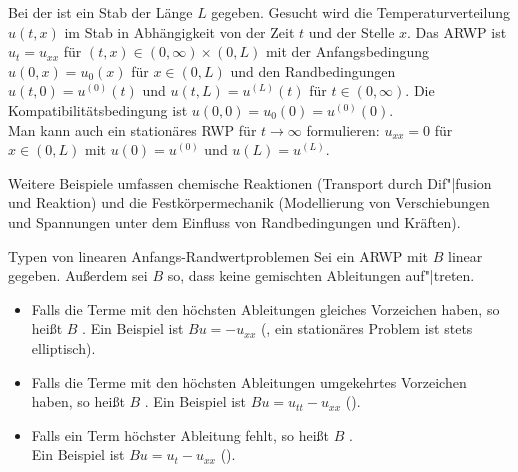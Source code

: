 \begin{Bsp}
    Bei der  ist ein Stab
    der Länge $L$ gegeben.
    Gesucht wird die Temperaturverteilung $u(t, x)$ im Stab in Abhängigkeit
    von der Zeit $t$ und der Stelle $x$.
    Das ARWP ist $u_t = u_{xx}$ für $(t, x) \in (0, \infty) \times (0, L)$ mit
    der Anfangsbedingung $u(0, x) = u_0(x)$ für $x \in (0, L)$ und den
    Randbedingungen $u(t, 0) = u^{(0)}(t)$ und $u(t, L) = u^{(L)}(t)$
    für $t \in (0, \infty)$.
    Die Kompatibilitätsbedingung ist $u(0, 0) = u_0(0) = u^{(0)}(0)$.\\
    Man kann auch ein stationäres RWP für $t \to \infty$ formulieren:
    $u_{xx} = 0$ für $x \in (0, L)$ mit
    $u(0) = u^{(0)}$ und $u(L) = u^{(L)}$.
\end{Bsp}

\begin{Bsp}
    Weitere Beispiele umfassen chemische Reaktionen
    (Transport durch Dif"|fusion und Reaktion) und die Festkörpermechanik
    (Modellierung von Verschiebungen und Spannungen unter dem Einfluss von
    Randbedingungen und Kräften).
\end{Bsp}

\linie

\begin{Def}{Typen von linearen Anfangs-Randwertproblemen}
    Sei ein ARWP mit $B$ linear gegeben.
    Außerdem sei $B$ so, dass keine gemischten Ableitungen auf"|treten.
    \begin{itemize}
        \item
        Falls die Terme mit den höchsten Ableitungen gleiches Vorzeichen
        haben, so heißt $B$ .
        Ein Beispiel ist $Bu = -u_{xx}$
        (,
        ein stationäres Problem ist stets elliptisch).

        \item
        Falls die Terme mit den höchsten Ableitungen umgekehrtes Vorzeichen
        haben, so heißt $B$ .
        Ein Beispiel ist $Bu = u_{tt} - u_{xx}$
        ().

        \item
        Falls ein Term höchster Ableitung fehlt,
        so heißt $B$ .\\
        Ein Beispiel ist $Bu = u_t - u_{xx}$
        ().
    \end{itemize}
\end{Def}

